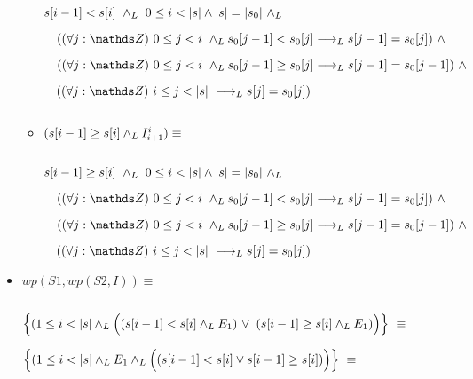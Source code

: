 \documentclass{article}
\begin{document}
\begin{itemize}
\begin{itemize}
        $ $

        $ s[i-1] < s[i]\ \land _L\ 0 \leq i < |s| \wedge |s| = |s_0|\ \land _L $

        $ \quad (\paraTodo{j}{0}{i} \yLuego s_0[j-1] < s_0[j] \implicaLuego s[j-1] = s_0[j])\ \wedge $

        $ \quad (\paraTodo{j}{0}{i} \yLuego s_0[j-1] \geq s_0[j] \implicaLuego s[j-1] = s_0[j-1])\ \wedge $

        $ \quad (\paraTodo{j}{i}{\longitud{s}} \implicaLuego s[j] = s_0[j]) $

        $ $

        \item $(s[i-1] \geq s[i] \land _L I_{i+1}^{i}) \equiv$

        $ $

        $ s[i-1] \geq s[i]\ \land _L\ 0 \leq i < |s| \wedge |s| = |s_0|\ \land _L $

        $ \quad (\paraTodo{j}{0}{i} \yLuego s_0[j-1] < s_0[j] \implicaLuego s[j-1] = s_0[j])\ \wedge $

        $ \quad (\paraTodo{j}{0}{i} \yLuego s_0[j-1] \geq s_0[j] \implicaLuego s[j-1] = s_0[j-1])\ \wedge $

        $ \quad (\paraTodo{j}{i}{\longitud{s}} \implicaLuego s[j] = s_0[j]) $

    \end{itemize} %

    \item $wp(S1, wp(S2, I)) \equiv$

    $ $

    $ \Big\{(1 \leq i < |s| \land _L \Big((s[i-1] < s[i] \land _L E_1)\ \vee $
    $ (s[i-1] \geq s[i] \yLuego E_1) \Big) \Big\}\ \equiv$

    $ \Big\{(1 \leq i < \longitud{s} \yLuego E_1 \yLuego \Big((s[i-1] < s[i] \vee s[i-1] \geq s[i]) \Big) \Big\}\ \equiv$

\end{itemize}
\end{document}
